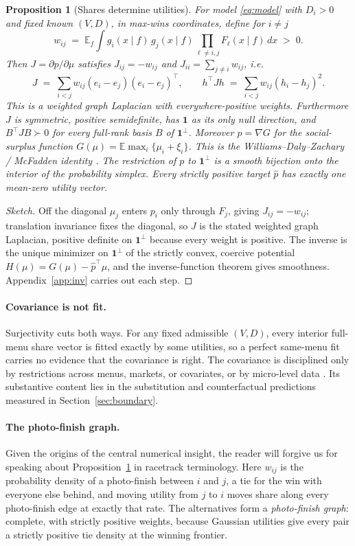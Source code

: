 \documentclass[12pt]{article}
\newtheorem{proposition}{Proposition}
\theoremstyle{remark}
\newcommand{\E}{\mathbb{E}}
\begin{document}
\begin{proposition}[Shares determine utilities]\label{thm:inv}
For model \eqref{eq:model} with $D_i > 0$ and fixed known $(V, D)$, in
max-wins coordinates, define
for $i \ne j$
\[
w_{ij} \;=\; \E_f \int g_i(x \mid f)\, g_j(x \mid f)
\prod_{\ell \ne i,j} F_\ell(x \mid f)\, dx \;>\; 0 .
\]
Then $J = \partial p / \partial \mu$ satisfies $J_{ij} = -w_{ij}$ and
$J_{ii} = \sum_{j \ne i} w_{ij}$, i.e.
\[
J \;=\; \sum_{i<j} w_{ij} (e_i - e_j)(e_i - e_j)^\top,
\qquad
h^\top J h \;=\; \sum_{i<j} w_{ij} (h_i - h_j)^2 .
\]
This is a weighted graph Laplacian with everywhere-positive weights.
Furthermore $J$ is symmetric,
positive semidefinite, has $\mathbf{1}$ as its only null direction, and
$B^\top J B \succ 0$ for every full-rank basis $B$ of $\mathbf{1}^\perp$.
Moreover $p = \nabla G$ for the social-surplus function
$G(\mu) = \E \max_i \{\mu_i + \xi_i\}$. This is the Williams--Daly--Zachary /
McFadden identity \citep{williams1977,daly1978,mcfadden1981}. The restriction of $p$ to
$\mathbf{1}^\perp$ is a smooth bijection onto the interior of the
probability simplex. Every strictly positive target $\hat p$ has exactly one
mean-zero utility vector.
\end{proposition}
\begin{proof}[Sketch]
Off the diagonal $\mu_j$ enters $p_i$ only through $F_j$, giving
$J_{ij} = -w_{ij}$; translation invariance fixes the diagonal, so $J$ is
the stated weighted graph Laplacian, positive definite on
$\mathbf{1}^\perp$ because every weight is positive. The inverse is the
unique minimizer on $\mathbf{1}^\perp$ of the strictly convex, coercive
potential $H(\mu) = G(\mu) - \hat p^\top \mu$, and the inverse-function
theorem gives smoothness. Appendix~\ref{app:inv} carries out each step.
\end{proof}

\paragraph{Covariance is not fit.} Surjectivity cuts both
ways. For any fixed admissible $(V, D)$, every interior full-menu share
vector is fitted exactly by some utilities, so a perfect same-menu fit
carries no evidence that the covariance is right. The covariance is
disciplined only by restrictions across menus, markets, or covariates,
or by micro-level data \citep{chang2022}. Its substantive content lies
in the substitution and counterfactual predictions measured in
Section~\ref{sec:boundary}.

\paragraph{The photo-finish graph.} Given the origins of the central numerical insight, the reader will forgive us for speaking about Proposition~\ref{thm:inv} in racetrack terminology. Here $w_{ij}$ is the probability density of a photo-finish between
$i$ and $j$, a tie for the win with everyone else behind, and moving
utility from $j$ to $i$ moves share along every photo-finish edge at
exactly that rate. The alternatives form a \emph{photo-finish graph}:
complete, with strictly positive weights, because Gaussian utilities give
every pair a strictly positive tie density at the winning frontier.
\end{document}
